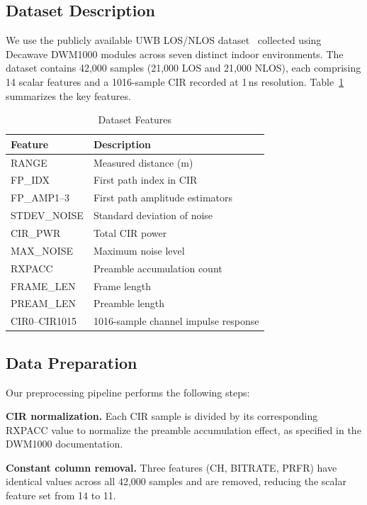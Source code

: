 \documentclass[conference]{IEEEtran}
\begin{document}
\subsection{Dataset Description}

We use the publicly available UWB LOS/NLOS dataset~\cite{b7} collected using Decawave DWM1000 modules across seven distinct indoor environments. The dataset contains 42,000 samples (21,000 LOS and 21,000 NLOS), each comprising 14 scalar features and a 1016-sample CIR recorded at 1\,ns resolution. Table~\ref{tab:features} summarizes the key features.

\begin{table}[t]
\caption{Dataset Features}
\label{tab:features}
\centering
\begin{tabular}{@{}ll@{}}
\toprule
\textbf{Feature} & \textbf{Description} \\
\midrule
RANGE & Measured distance (m) \\
FP\_IDX & First path index in CIR \\
FP\_AMP1--3 & First path amplitude estimators \\
STDEV\_NOISE & Standard deviation of noise \\
CIR\_PWR & Total CIR power \\
MAX\_NOISE & Maximum noise level \\
RXPACC & Preamble accumulation count \\
FRAME\_LEN & Frame length \\
PREAM\_LEN & Preamble length \\
CIR0--CIR1015 & 1016-sample channel impulse response \\
\bottomrule
\end{tabular}
\end{table}

\subsection{Data Preparation}

Our preprocessing pipeline performs the following steps:

\textbf{CIR normalization.} Each CIR sample is divided by its corresponding RXPACC value to normalize the preamble accumulation effect, as specified in the DWM1000 documentation.

\textbf{Constant column removal.} Three features (CH, BITRATE, PRFR) have identical values across all 42,000 samples and are removed, reducing the scalar feature set from 14 to 11.
\end{document}

